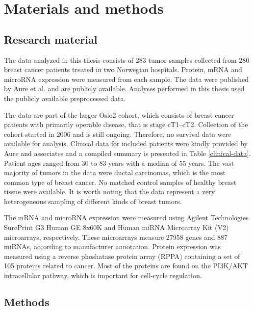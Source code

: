 

\section{Materials and methods}\label{materials-and-methods}

\subsection{Research material}

The data analyzed in this thesis consists of 283 tumor samples collected from
280 breast cancer patients treated in two Norwegian hospitals. Protein, mRNA
and microRNA expression were measured from each sample. The data were
published by Aure et al. \citep{Aure2015} and are publicly available. Analyses
performed in this thesis used the publicly available preprocessed data.

The data are part of the larger Oslo2 cohort, which consists of breast cancer
patients with primarily operable disease, that is stage cT1--cT2. Collection
of the cohort started in 2006 and is still ongoing. Therefore, no survival
data were available for analysis. Clinical data for included patients were
kindly provided by Aure and associates and a compiled summary is presented in
Table \ref{clinical-data}. Patient ages ranged from 30 to 83 years with a median of 55 years.
The vast majority of tumors in the data were ductal carcinomas, which
is the most common type of breast cancer. No matched
control samples of healthy breast tissue were available. It is worth noting
that the data represent a very heterogeneous sampling of different kinds of
breast tumors.



The mRNA and microRNA expression were measured using Agilent Technologies
SurePrint G3 Human GE 8x60K and Human miRNA Microarray Kit (V2) microarrays,
respectively. These microarrays measure 27958 genes and 887 miRNAs, according
to manufacturer annotation. Protein expression was measured using a reverse
phoshatase protein array (RPPA) containing a set of 105 proteins related to
cancer. Most of the proteins are found on the PI3K/AKT intracellular pathway,
which is important for cell-cycle regulation.




\subsection{Methods}


